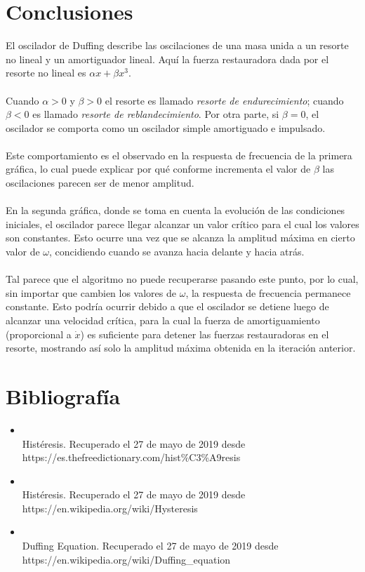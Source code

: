 \documentclass[letterpaper,12pt]{article}
\begin{document}
\section{Conclusiones}
  El oscilador de Duffing describe las oscilaciones de una masa unida a un resorte no lineal y un amortiguador lineal.
  Aquí la fuerza restauradora dada por el resorte no lineal es $\alpha x+\beta x^{3}$.
\\\\
Cuando $\alpha>0$ y $\beta>0$ el resorte es llamado \emph{resorte de endurecimiento}; cuando $\beta<0$ es llamado \emph{resorte de reblandecimiento}. Por otra parte, si $\beta=0$, el oscilador se comporta como un oscilador simple amortiguado e impulsado. 
\\\\
Este comportamiento es el observado en la respuesta de frecuencia de la primera gráfica, lo cual puede explicar por qué conforme incrementa el valor de $\beta$ las oscilaciones parecen ser de menor amplitud.
\\\\
En la segunda gráfica, donde se toma en cuenta la evolución de las condiciones iniciales, el oscilador parece llegar alcanzar un valor crítico para el cual los valores son constantes. Esto ocurre una vez que se alcanza la amplitud máxima en cierto valor de $\omega$, concidiendo cuando se avanza hacia delante y hacia atrás.\\\\

Tal parece que el algoritmo no puede recuperarse pasando este punto, por lo cual, sin importar que cambien los valores de $\omega$, la respuesta de frecuencia permanece constante. Esto podría ocurrir debido a que el oscilador se detiene luego de alcanzar una velocidad crítica, para la cual la fuerza de amortiguamiento (proporcional a $\Dot{x}$) es suficiente para detener las fuerzas restauradoras en el resorte, mostrando así solo la amplitud máxima obtenida en la iteración anterior. 



\section*{Bibliografía}
\begin{itemize}
\item \\Histéresis. Recuperado el 27 de mayo de 2019 desde \\https://es.thefreedictionary.com/hist\%C3\%A9resis
\\

\item \\Histéresis. Recuperado el 27 de mayo de 2019 desde \\https://en.wikipedia.org/wiki/Hysteresis
\\

\item \\Duffing Equation. Recuperado el 27 de mayo de 2019 desde \\https://en.wikipedia.org/wiki/Duffing\_equation
\\


\end{itemize}
\end{document}
